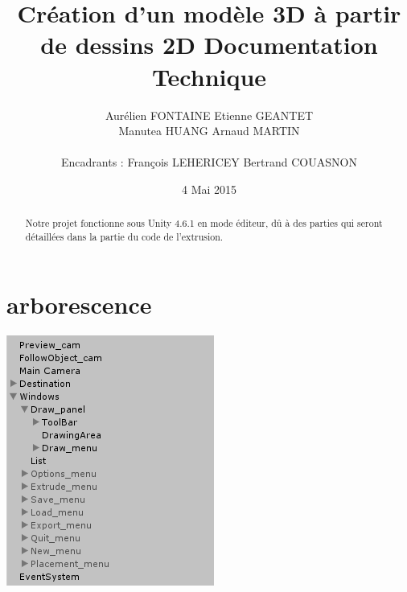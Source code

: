 \documentclass[a4paper,11pt]{article}
\title{ \textbf{Création d'un modèle 3D à partir de dessins 2D Documentation Technique} }
\author{ Aurélien \textsc{FONTAINE} Etienne \textsc{GEANTET} \\
	Manutea \textsc{HUANG} Arnaud \textsc{MARTIN} \\
	\\
	Encadrants : François \textsc{LEHERICEY}	Bertrand \textsc{COUASNON}}
\date{4 Mai 2015}                    %
\begin{document}
\maketitle                 %
\thispagestyle{empty}      %

\begin{abstract}
	Notre projet fonctionne sous Unity 4.6.1 en mode éditeur, dû à des parties qui seront détaillées dans la partie du code de l'extrusion.
\end{abstract}

\section{arborescence}
\includegraphics[scale=0.7]{./images/arborescence.png}
\end{document}
